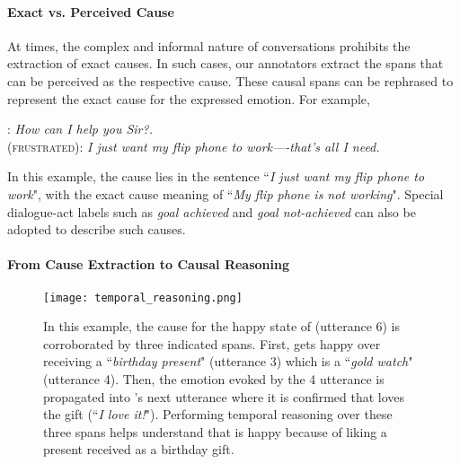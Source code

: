 \documentclass[smallextended]{svjour3}
\newcommand\emo[1]{\textsc{#1}}
\newcommand\0{\hphantom{0}}
\begin{document}
\paragraph{Exact vs. Perceived Cause} At times, the complex and informal nature of conversations prohibits the extraction of exact causes. In such cases, our annotators extract the spans that can be perceived as the respective cause. These causal spans can be rephrased to represent the exact cause for the expressed emotion. For example,

\begin{exe}
\ex { (\emo{neutral})}: \textit{How can I help you Sir?.}\\
{ (\emo{frustrated})}: \textit{I just want my flip phone to work----that's all I need.}
\label{ex:exact1}
\end{exe}
In this example, the cause lies in the sentence ``\textit{I just want my flip phone to work}", with the exact cause meaning of ``\textit{My flip phone is not working}". Special dialogue-act labels such as \emph{goal achieved} and \emph{goal not-achieved} can also be adopted to describe such causes.

\paragraph{From Cause Extraction to Causal Reasoning}

\begin{figure}[t!]
    \centering
    \texttt{[image: temporal\_reasoning.png]}
    \caption{{In this example, the cause for the happy state of  (utterance 6) is corroborated by three indicated spans. First,  gets happy over receiving a ``\textit{birthday present}" (utterance 3) which is a ``\textit{gold watch}" (utterance 4). Then, the emotion evoked by the 4 utterance is propagated into 's next utterance where it is confirmed that  loves the gift (``\textit{I love it!}"). Performing temporal reasoning over these three spans helps understand that  is happy because of liking a present received as a birthday gift.}}
    \label{fig:temporal_reasoning}
\end{figure}
\end{document}
